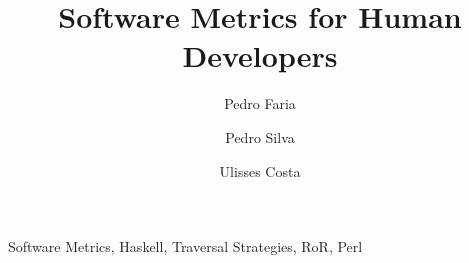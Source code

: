 \documentclass[citeauthoryear]{llncs}
\title{Software Metrics for Human Developers}
\author{Pedro Faria \and Pedro Silva \and Ulisses Costa}
\institute{Department of Informatics, University of Minho}
\begin{document}
\maketitle



\keywords Software Metrics, Haskell, Traversal Strategies, RoR, Perl








\end{document}
